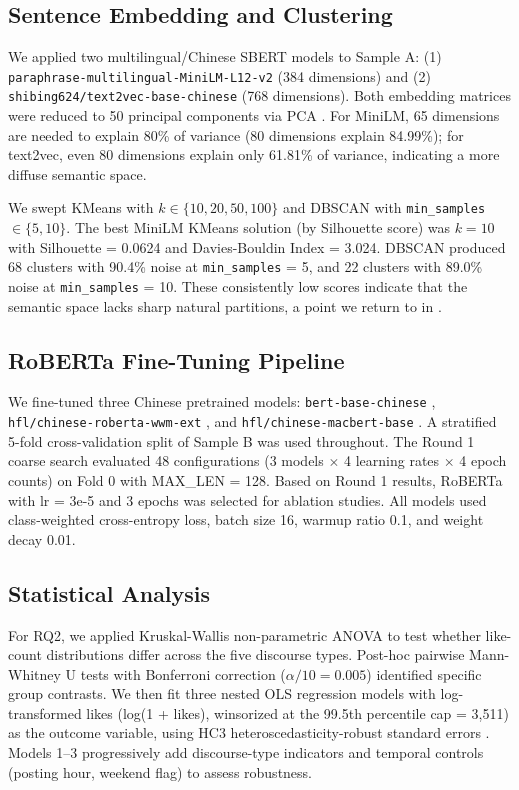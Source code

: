 \documentclass[man, 12pt, mask, floatsintext]{apa7}
\begin{document}
\subsection{Sentence Embedding and Clustering}
We applied two multilingual/Chinese SBERT models to Sample A: (1) \texttt{paraphrase-multilingual-MiniLM-L12-v2} (384 dimensions) and (2) \texttt{shibing624/text2vec-base-chinese} (768 dimensions). Both embedding matrices were reduced to 50 principal components via PCA \parencite{lloyd1982kmeans}. For MiniLM, 65 dimensions are needed to explain 80\% of variance (80 dimensions explain 84.99\%); for text2vec, even 80 dimensions explain only 61.81\% of variance, indicating a more diffuse semantic space.

We swept KMeans \parencite{lloyd1982kmeans} with $k \in \{10, 20, 50, 100\}$ and DBSCAN \parencite{ester1996dbscan} with \texttt{min\_samples} $\in \{5, 10\}$. The best MiniLM KMeans solution (by Silhouette score) was $k = 10$ with Silhouette = 0.0624 and Davies-Bouldin Index = 3.024. DBSCAN produced 68 clusters with 90.4\% noise at \texttt{min\_samples} = 5, and 22 clusters with 89.0\% noise at \texttt{min\_samples} = 10. These consistently low scores indicate that the semantic space lacks sharp natural partitions, a point we return to in .

\subsection{RoBERTa Fine-Tuning Pipeline}
\label{sec:finetune}
We fine-tuned three Chinese pretrained models: \texttt{bert-base-chinese} \parencite{devlin2019bert}, \texttt{hfl/chinese-roberta-wwm-ext} \parencite{liu2019roberta, cui2020macbert}, and \texttt{hfl/chinese-macbert-base} \parencite{cui2020macbert}. A stratified 5-fold cross-validation split of Sample B was used throughout. The Round 1 coarse search evaluated 48 configurations (3 models $\times$ 4 learning rates $\times$ 4 epoch counts) on Fold 0 with MAX\_LEN = 128. Based on Round 1 results, RoBERTa with lr = 3e-5 and 3 epochs was selected for ablation studies. All models used class-weighted cross-entropy loss, batch size 16, warmup ratio 0.1, and weight decay 0.01.

\subsection{Statistical Analysis}
For RQ2, we applied Kruskal-Wallis non-parametric ANOVA to test whether like-count distributions differ across the five discourse types. Post-hoc pairwise Mann-Whitney U tests with Bonferroni correction ($\alpha/10 = 0.005$) identified specific group contrasts. We then fit three nested OLS regression models with log-transformed likes (log(1 + likes), winsorized at the 99.5th percentile cap = 3,511) as the outcome variable, using HC3 heteroscedasticity-robust standard errors \parencite{bail2018}. Models 1--3 progressively add discourse-type indicators and temporal controls (posting hour, weekend flag) to assess robustness.
\end{document}
